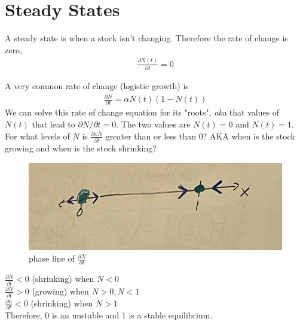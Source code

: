 \documentclass{article}
\begin{document}
\section{Steady States}
A steady state is when a stock isn't changing. Therefore the rate of change is zero, 
\begin{align*}
    \frac{\partial N(t)}{\partial t} = 0
\end{align*}

A very common rate of change (logistic growth) is
\begin{align*}
    \frac{\partial N}{\partial t} = \alpha N(t) (1 - N(t)) 
\end{align*}
We can solve this rate of change equation for its "roots", \textit{aka} that values of $N(t)$ that lead to $\partial N / \partial t =0$. The two values are $N(t) = 0$ and $N(t) = 1$. \\

For what levels of $N$ is $\frac{\partial xN}{\partial t}$ greater than or less than 0? AKA when is the stock growing and when is the stock shrinking? 

\begin{figure}[htp]
    \centering
    \includegraphics[width=0.5\linewidth]{Screen Shot 2023-11-13 at 11.52.17 AM.png}
    \caption{phase line of $\frac{\partial N}{\partial t}$}
\end{figure}

$\frac{\partial N}{\partial t} < 0$ (shrinking) when $N < 0$ \\
$\frac{\partial N}{\partial t} > 0$ (growing) when $N > 0, N < 1$ \\
$\frac{\partial n}{\partial t} < 0$ (shrinking) when $N > 1$ \\

Therefore, 0 is an unstable and 1 is a stable equilibrium. 
\end{document}
